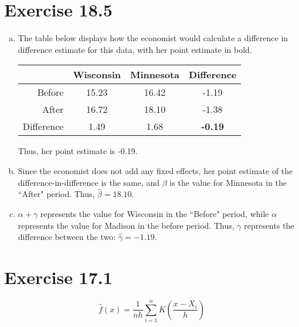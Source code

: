 \documentclass{article}
\newcommand{\bhat}{\hat{\beta}}
\begin{document}

\section*{Exercise 18.5}

\begin{enumerate}[(a)]
	\item The table below displays how the economist would calculate a difference in difference estimate for this data, with her point estimate in bold.
		\begin{center}
			\begin{tabular}{r|cc|c}
						& Wisconsin	& Minnesota & Difference	\\\hline 
			Before		& 15.23		& 16.42		& -1.19			\\
			After		& 16.72		& 18.10		& -1.38			\\\hline 
			Difference 	& 1.49		& 1.68		& \textbf{-0.19}
			\end{tabular}
		\end{center}
		Thus, her point estimate is -0.19.
	
	\item Since the economist does not add any fixed effects, her point estimate of the difference-in-difference is the same, and $\beta$ is the value for Minnesota in the ``After" period. Thus, ${\bhat=18.10}$.
	
	\item $\alpha+\gamma$ represents the value for Wisconsin in the ``Before" period, while $\alpha$ represents the value for Madison in the before period. Thus, $\gamma$ represents the difference between the two: ${\hat{\gamma}=-1.19}$.
	
\end{enumerate}

\pagebreak
\section*{Exercise 17.1}

$$ \hat{f}(x) = \frac{1}{nh}\sum_{i=1}^n K\left(\frac{x-X_i}{h}\right) $$
\end{document}
